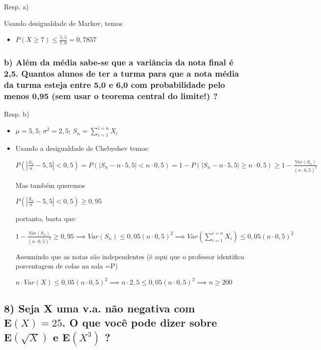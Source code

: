 \documentclass[portuguese]{article}
\begin{document}
Resp. a)

Usando desigualdade de Markov, temos
\begin{itemize}
\item $P(X\ge7)\le\frac{5,5}{7,0}=0,7857$
\end{itemize}

\subsubsection*{\textmd{b) Além da média sabe-se que a variância da nota final é
2,5. Quantos alunos de ter a turma para que a nota média da turma
esteja entre 5,0 e 6,0 com probabilidade pelo menos 0,95 (sem usar
o teorema central do limite!) ?}}

Resp. b)
\begin{itemize}
\item $\mu=5,5$; $\sigma^{2}=2,5$; $S_{n}=\sum_{i=1}^{i=n}X_{i}$
\item Usando a desigualdade de Chebyshev temos:


$P(\left|\frac{S_{n}}{n}-5,5\right|<0,5)=P(\left|S_{n}-n\cdot5,5\right|<n\cdot0,5)=1-P(\left|S_{n}-n\cdot5,5\right|\ge n\cdot0,5)\ge1-\frac{Var(S_{n})}{(n\cdot0,5)^{2}}$


Mas também queremos


$P(\left|\frac{S_{n}}{n}-5,5\right|<0,5)\ge0,95$


portanto, basta que:


$1-\frac{Var(S_{n})}{(n\cdot0,5)^{2}}\ge0,95\implies Var(S_{n})\le0,05(n\cdot0,5)^{2}\implies Var(\sum_{i=1}^{i=n}X_{i})\le0,05(n\cdot0,5)^{2}$


Assumindo que as notas são independentes (é aqui que o professor identifica
porcentagem de colas na sala =P)


$n\cdot Var(X)\le0,05(n\cdot0,5)^{2}\implies n\cdot2,5\le0,05(n\cdot0,5)^{2}\implies n\ge200$

\end{itemize}

\subsection*{\textcompwordmark{}}


\subsection*{\textmd{8) Seja X uma v.a. não negativa com $\mathbf{E}(X)=25$.
O que você pode dizer sobre $\mathbf{E}(\sqrt{X})$ e $\mathbf{E}(X^{3})$
?}}
\end{document}
